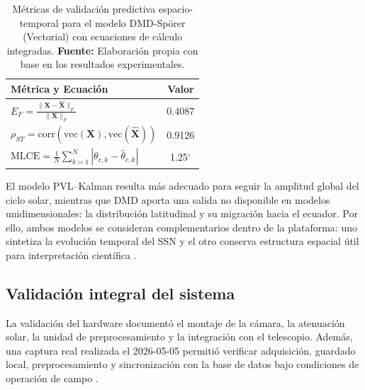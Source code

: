 \begin{table}[H]
\centering
\caption{Métricas de validación predictiva espacio-temporal para el modelo DMD-Spörer (Vectorial) con ecuaciones de cálculo integradas. \textbf{Fuente:} Elaboración propia con base en los resultados experimentales.}
\label{tab:resumen-prediccion-vectorial}
\begin{tabular}{lc}
\toprule
\textbf{Métrica y Ecuación} & \textbf{Valor} \\
\midrule
$\textstyle E_F=\frac{\|\mathbf{X}-\widehat{\mathbf{X}}\|_F}{\|\mathbf{X}\|_F}$ & 0.4087 \\
\addlinespace
$\textstyle \rho_{ST}=\mathrm{corr}\left(\mathrm{vec}(\mathbf{X}),\mathrm{vec}(\widehat{\mathbf{X}})\right)$ & 0.9126 \\
\addlinespace
$\textstyle \mathrm{MLCE}=\frac{1}{N}\sum_{k=1}^{N}|\theta_{c,k}-\widehat{\theta}_{c,k}|$ & 1.25$^\circ$ \\
\bottomrule
\end{tabular}
\end{table}

El modelo PVL--Kalman resulta más adecuado para seguir la amplitud global del ciclo solar, mientras que DMD aporta una salida no disponible en modelos unidimensionales: la distribución latitudinal y su migración hacia el ecuador. Por ello, ambos modelos se consideran complementarios dentro de la plataforma: uno sintetiza la evolución temporal del SSN y el otro conserva estructura espacial útil para interpretación científica \citep{hathaway2015solarcycle,podladchikova2012kalman,kutz2016dmd}.

\subsection{Validación integral del sistema}

La validación del hardware documentó el montaje de la cámara, la atenuación solar, la unidad de preprocesamiento y la integración con el telescopio. Además, una captura real realizada el 2026-05-05 permitió verificar adquisición, guardado local, preprocesamiento y sincronización con la base de datos bajo condiciones de operación de campo \citep{zwoASILinuxManual,raspberryPi5Docs2026}.

